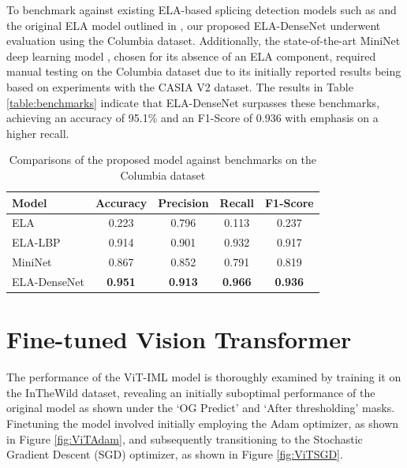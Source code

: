 To benchmark against existing ELA-based splicing detection models such as \cite{zhang2021image} and the original ELA model outlined in \cite{krawetz2007picture}, our proposed ELA-DenseNet underwent evaluation using the Columbia dataset. Additionally, the state-of-the-art MiniNet deep learning model \cite{tyagi2023mininet}, chosen for its absence of an ELA component, required manual testing on the Columbia dataset due to its initially reported results being based on experiments with the CASIA V2 dataset. The results in Table \ref{table:benchmarks} indicate that ELA-DenseNet surpasses these benchmarks, achieving an accuracy of 95.1\% and an F1-Score of 0.936 with emphasis on a higher recall.

\begin{table}[!h]
\centering
\begin{tabular}{|l|c|c|c|c|}
\hline
Model & Accuracy & Precision & Recall & F1-Score \\ \hline
ELA  & 0.223 &  0.796 & 0.113& 0.237 \\ \hline
ELA-LBP & 0.914 & 0.901 & 0.932 & 0.917 \\ \hline
MiniNet & 0.867 & 0.852 & 0.791 & 0.819 \\ \hline
ELA-DenseNet & \textbf{0.951} & \textbf{0.913} & \textbf{0.966} & \textbf{0.936} \\ \hline
\end{tabular}
\caption{Comparisons of the proposed model against benchmarks on the Columbia dataset}
\end{table}
\label{table:benchmarks}


  \section{Fine-tuned Vision Transformer} \label{sec:s2}
  
The performance of the ViT-IML model is thoroughly examined by training it on the InTheWild \cite{huh2018fighting} dataset, revealing an initially suboptimal performance of the original model as shown under the `OG Predict' and `After thresholding' masks. Finetuning the model involved initially employing the Adam optimizer, as shown in Figure \ref{fig:ViTAdam}, and subsequently transitioning to the Stochastic Gradient Descent (SGD) optimizer, as shown in Figure \ref{fig:ViTSGD}.

